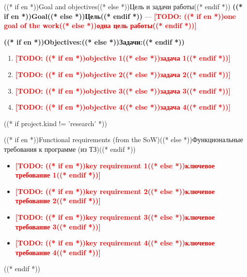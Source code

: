 \documentclass[aspectratio=169, 14pt]{beamer}
\newcommand{\todo}[1]{\textcolor{red}{\textbf{[TODO: #1]}}}
\begin{document}
\begin{frame}{((* if en *))Goal and objectives((* else *))Цель и задачи работы((* endif *))}
  \textcolor{hseblue}{\textbf{((* if en *))Goal((* else *))Цель((* endif *))}} — \todo{((* if en *))one goal of the work((* else *))одна цель работы((* endif *))}

  \vspace{0.5em}
  {\color{hseblue}\textbf{((* if en *))Objectives:((* else *))Задачи:((* endif *))}}
  \begin{enumerate}
    \item \todo{((* if en *))objective 1((* else *))задача 1((* endif *))}
    \item \todo{((* if en *))objective 2((* else *))задача 2((* endif *))}
    \item \todo{((* if en *))objective 3((* else *))задача 3((* endif *))}
    \item \todo{((* if en *))objective 4((* else *))задача 4((* endif *))}
  \end{enumerate}
\end{frame}

((* if project.kind != 'research' *))
\begin{frame}{((* if en *))Functional requirements (from the SoW)((* else *))Функциональные требования к программе (из ТЗ)((* endif *))}
  \begin{itemize}
    \item \todo{((* if en *))key requirement 1((* else *))ключевое требование 1((* endif *))}
    \item \todo{((* if en *))key requirement 2((* else *))ключевое требование 2((* endif *))}
    \item \todo{((* if en *))key requirement 3((* else *))ключевое требование 3((* endif *))}
    \item \todo{((* if en *))key requirement 4((* else *))ключевое требование 4((* endif *))}
  \end{itemize}
\end{frame}
((* endif *))
\end{document}
